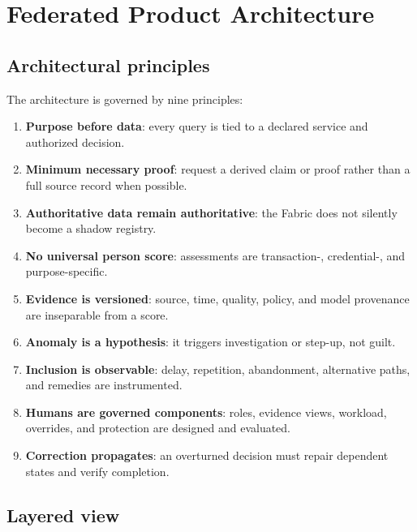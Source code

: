 \chapter{Federated Product Architecture}

\section{Architectural principles}

The architecture is governed by nine principles:

\begin{enumerate}
\item \textbf{Purpose before data}: every query is tied to a declared service and authorized decision.
\item \textbf{Minimum necessary proof}: request a derived claim or proof rather than a full source record when possible.
\item \textbf{Authoritative data remain authoritative}: the Fabric does not silently become a shadow registry.
\item \textbf{No universal person score}: assessments are transaction-, credential-, and purpose-specific.
\item \textbf{Evidence is versioned}: source, time, quality, policy, and model provenance are inseparable from a score.
\item \textbf{Anomaly is a hypothesis}: it triggers investigation or step-up, not guilt.
\item \textbf{Inclusion is observable}: delay, repetition, abandonment, alternative paths, and remedies are instrumented.
\item \textbf{Humans are governed components}: roles, evidence views, workload, overrides, and protection are designed and evaluated.
\item \textbf{Correction propagates}: an overturned decision must repair dependent states and verify completion.
\end{enumerate}

\section{Layered view}

